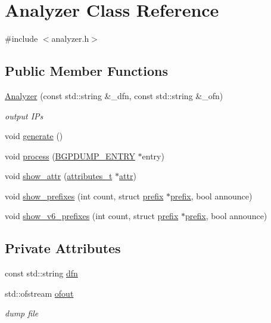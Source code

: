 \hypertarget{classAnalyzer}{\section{Analyzer Class Reference}
\label{classAnalyzer}
}


{\ttfamily \#include $<$analyzer.\-h$>$}

\subsection*{Public Member Functions}
\begin{DoxyCompactItemize}
\item 
\hyperlink{classAnalyzer_ac7483f2333225c1a79a7a14faf833716}{Analyzer} (const std\-::string \&\-\_\-dfn, const std\-::string \&\-\_\-ofn)
\begin{DoxyCompactList}\small\item\em output I\-Ps \end{DoxyCompactList}\item 
void \hyperlink{classAnalyzer_a81389370bbaa94080a5adae11c6e7107}{generate} ()
\item 
void \hyperlink{classAnalyzer_a35af696b9422219939cd105a01d9610e}{process} (\hyperlink{bgpdump__formats_8h_ad19c13df48a6e0256f234c0747ff1752}{B\-G\-P\-D\-U\-M\-P\-\_\-\-E\-N\-T\-R\-Y} $\ast$entry)
\item 
void \hyperlink{classAnalyzer_a1a88acdbd84654d28fa38486cdb6913f}{show\-\_\-attr} (\hyperlink{bgpdump__attr_8h_a851314552296238881b06768eb835f95}{attributes\-\_\-t} $\ast$\hyperlink{bgpdump__attr_8h_structattr}{attr})
\item 
void \hyperlink{classAnalyzer_af93a215e0db3f556a8fbd787383c13f9}{show\-\_\-prefixes} (int count, struct \hyperlink{bgpdump__attr_8h_structprefix}{prefix} $\ast$\hyperlink{bgpdump__attr_8h_structprefix}{prefix}, bool announce)
\item 
void \hyperlink{classAnalyzer_af164aeb9f9d5b3be9db21e61e2a88eea}{show\-\_\-v6\-\_\-prefixes} (int count, struct \hyperlink{bgpdump__attr_8h_structprefix}{prefix} $\ast$\hyperlink{bgpdump__attr_8h_structprefix}{prefix}, bool announce)
\end{DoxyCompactItemize}
\subsection*{Private Attributes}
\begin{DoxyCompactItemize}
\item 
const std\-::string \hyperlink{classAnalyzer_abb4239dc1b174539a12839dba3b27db9}{dfn}
\item 
std\-::ofstream \hyperlink{classAnalyzer_af0b0e406c71e07e7e7a41f2d10eb528f}{ofout}
\begin{DoxyCompactList}\small\item\em dump file \end{DoxyCompactList}\end{DoxyCompactItemize}


